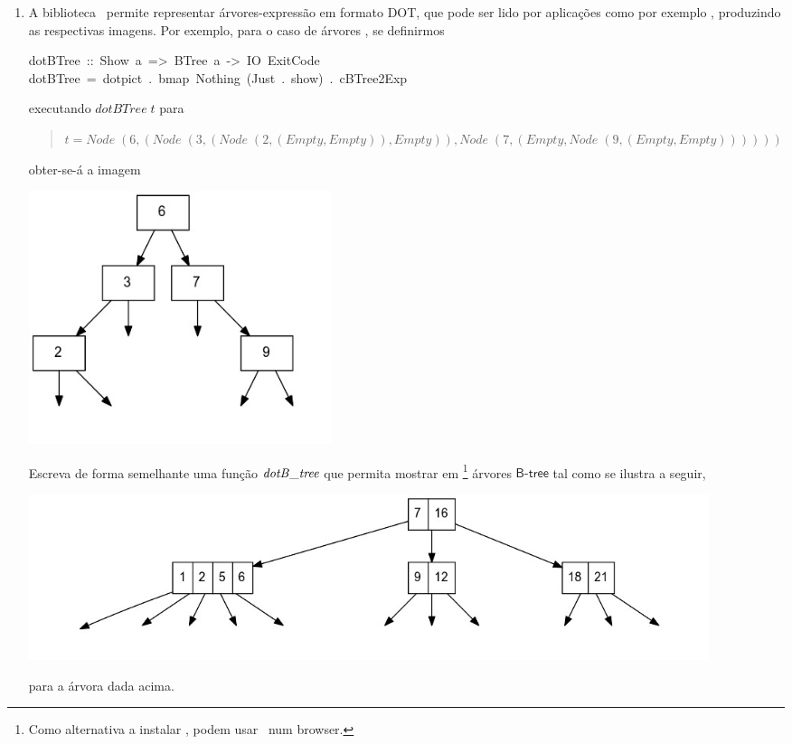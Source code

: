 \documentclass[a4paper]{article}
\newcommand{\Conid}[1]{\mathit{#1}}
\newcommand{\Varid}[1]{\mathit{#1}}
\def\resethooks{%
  \global\let\SaveRestoreHook\empty
  \global\let\ColumnHook\empty}
\let\hspre\empty
\let\hspost\empty
\begin{document}
\begin{enumerate}
\item	A biblioteca \Exp\ permite representar árvores-expressão em formato
        DOT, que pode ser lido por aplicações como por exemplo \Graphviz, produzindo
        as respectivas imagens. Por exemplo, para o caso de árvores \BTree, se definirmos
\begin{hscode}\SaveRestoreHook
\column{B}{@{}>{\hspre}l<{\hspost}@{}}%
\column{E}{@{}>{\hspre}l<{\hspost}@{}}%
\>[B]{}\mbox{\onelinecomment dotBTree :: Show a => BTree a -> IO ExitCode}{}\<[E]%
\\
\>[B]{}\mbox{\onelinecomment dotBTree = dotpict . bmap Nothing (Just . show) . cBTree2Exp}{}\<[E]%
\ColumnHook
\end{hscode}\resethooks
        executando \ensuremath{\Varid{dotBTree}\;\Varid{t}} para
\begin{quote}\small
\ensuremath{\Varid{t}\mathrel{=}\Conid{Node}\;(\mathrm{6},(\Conid{Node}\;(\mathrm{3},(\Conid{Node}\;(\mathrm{2},(\Conid{Empty},\Conid{Empty})),\Conid{Empty})),\Conid{Node}\;(\mathrm{7},(\Conid{Empty},\Conid{Node}\;(\mathrm{9},(\Conid{Empty},\Conid{Empty}))))))}
\end{quote}
        obter-se-á a imagem
\begin{center}
       \includegraphics[width=0.4\textwidth]{cp1617t_media/dot1.jpg}
\end{center}
        Escreva de forma semelhante uma função \ensuremath{\Varid{dotB\char95 tree}} que permita mostrar em \Graphviz\footnote{Como alternativa a instalar \Graphviz, podem usar \WebGraphviz\ num browser.}
        árvores \ensuremath{\mathsf{B}\mbox{-}\mathsf{tree} } tal como se ilustra a seguir,
\begin{center}
       \includegraphics[width=0.9\textwidth]{cp1617t_media/dot2.jpg}
\end{center}
        para a árvora dada acima.
\end{enumerate}
\end{document}

